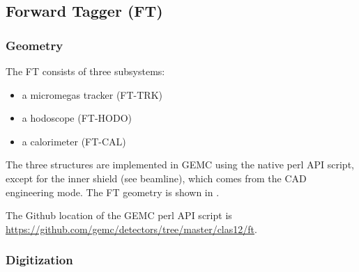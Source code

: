 \subsection{Forward Tagger (FT)}


\subsubsection{Geometry}

The FT consists of three subsystems:

\begin{itemize}
	\item a micromegas tracker (FT-TRK)
	\item a hodoscope (FT-HODO)
 	\item a calorimeter (FT-CAL)
\end{itemize}

The three structures are implemented in GEMC using the native perl API script, except for the inner shield (see beamline),
which comes from the CAD engineering mode.
The FT geometry is shown in .

The Github location of the GEMC perl API script is \url{https://github.com/gemc/detectors/tree/master/clas12/ft}.


\subsubsection{Digitization}


